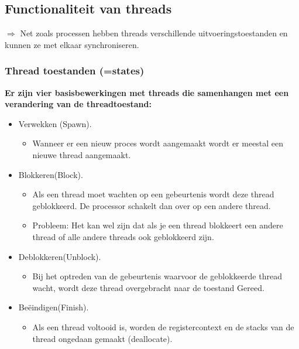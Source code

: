 
\newpage

\subsection{Functionaliteit van threads}

\noindent $\Rightarrow$ Net zoals processen hebben threads  verschillende uitvoeringstoestanden en kunnen ze met elkaar synchroniseren.

\subsubsection{Thread toestanden (=states)}

\textbf{Er zijn vier basisbewerkingen met threads die samenhangen met een verandering van de threadtoestand:}

\begin{itemize}
    \item Verwekken (Spawn).
        \begin{itemize}
        \item Wanneer er een nieuw proces wordt aangemaakt wordt er meestal een nieuwe thread aangemaakt.
        \end{itemize}
    \item Blokkeren(Block). 
        \begin{itemize}
        \item Als een thread moet wachten op een gebeurtenis wordt deze thread geblokkeerd. De processor schakelt dan over op een andere thread. 
        \item Probleem: Het kan wel zijn dat als je een thread blokkeert een andere thread of alle andere threads ook geblokkeerd zijn.
        \end{itemize} 
    \item Deblokkeren(Unblock). 
        \begin{itemize}
        \item Bij het optreden van de gebeurtenis waarvoor de geblokkeerde thread wacht, wordt deze thread overgebracht naar de toestand Gereed.
        \end{itemize}
    \item Beëindigen(Finish).
        \begin{itemize}
        \item Als een thread voltooid is, worden de registercontext en de stacks van de thread ongedaan gemaakt (deallocate).
        \end{itemize}
\end{itemize}

